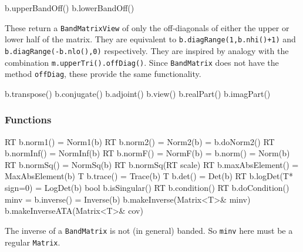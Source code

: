 \documentclass[twoside,letterpaper,11pt]{article}
\renewcommand{\tt}[1]{{\lstinline {#1}}}
\begin{document}
\begin{tmvcode}
b.upperBandOff()
b.lowerBandOff()
\end{tmvcode}
These return a \tt{BandMatrixView} of only the off-diagonals of either the
upper or lower half of the matrix.  They are equivalent to
\tt{b.diagRange(1,b.nhi()+1)} and \tt{b.diagRange(-b.nlo(),0)} respectively.  
They are inspired by analogy with the combination \tt{m.upperTri().offDiag()}.
Since \tt{BandMatrix} does not have the method \tt{offDiag}, these provide
the same functionality.

\begin{tmvcode}
b.transpose()
b.conjugate()
b.adjoint()
b.view()
b.realPart()
b.imagPart()
\end{tmvcode}
\vspace{12pt}

\subsubsection{Functions}

\begin{tmvcode}
RT b.norm1() = Norm1(b)
RT b.norm2() = Norm2(b) = b.doNorm2()
RT b.normInf() = NormInf(b)
RT b.normF() = NormF(b) = b.norm() = Norm(b)
RT b.normSq() = NormSq(b)
RT b.normSq(RT scale)
RT b.maxAbsElement() = MaxAbsElement(b)
T b.trace() = Trace(b)
T b.det() = Det(b)
RT b.logDet(T* sign=0) = LogDet(b)
bool b.isSingular()
RT b.condition()
RT b.doCondition()
minv = b.inverse() = Inverse(b)
b.makeInverse(Matrix<T>& minv)
b.makeInverseATA(Matrix<T>& cov)
\end{tmvcode}
The inverse of a \tt{BandMatrix} is not (in general) banded.  So \tt{minv} here
must be a regular \tt{Matrix}.
\end{document}
